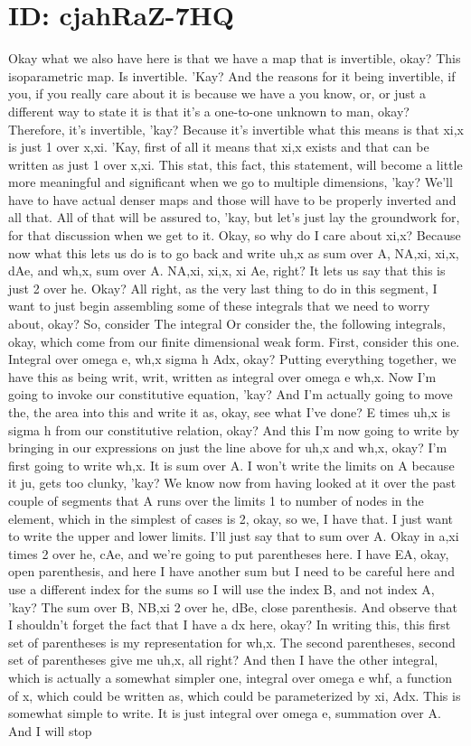 \documentclass[10pt]{article}
\begin{document}
\section*{ID: cjahRaZ-7HQ}
Okay what we also have here is that we have a map that is invertible, okay? This isoparametric map. Is invertible. 'Kay? And the reasons for it being invertible, if you, if you really care about it is because we have a you know, or, or just a different way to state it is that it's a one-to-one unknown to man, okay? Therefore, it's invertible, 'kay? Because it's invertible what this means is that xi,x is just 1 over x,xi. 'Kay, first of all it means that xi,x exists and that can be written as just 1 over x,xi. This stat, this fact, this statement, will become a little more meaningful and significant when we go to multiple dimensions, 'kay? We'll have to have actual denser maps and those will have to be properly inverted and all that. All of that will be assured to, 'kay, but let's just lay the groundwork for, for that discussion when we get to it. Okay, so why do I care about xi,x? Because now what this lets us do is to go back and write uh,x as sum over A, NA,xi, xi,x, dAe, and wh,x, sum over A. NA,xi, xi,x, xi Ae, right? It lets us say that this is just 2 over he. Okay? All right, as the very last thing to do in this segment, I want to just begin assembling some of these integrals that we need to worry about, okay? So, consider The integral Or consider the, the following integrals, okay, which come from our finite dimensional weak form. First, consider this one. Integral over omega e, wh,x sigma h Adx, okay? Putting everything together, we have this as being writ, writ, written as integral over omega e wh,x. Now I'm going to invoke our constitutive equation, 'kay? And I'm actually going to move the, the area into this and write it as, okay, see what I've done? E times uh,x is sigma h from our constitutive relation, okay? And this I'm now going to write by bringing in our expressions on just the line above for uh,x and wh,x, okay? I'm first going to write wh,x. It is sum over A. I won't write the limits on A because it ju, gets too clunky, 'kay? We know now from having looked at it over the past couple of segments that A runs over the limits 1 to number of nodes in the element, which in the simplest of cases is 2, okay, so we, I have that. I just want to write the upper and lower limits. I'll just say that to sum over A. Okay in a,xi times 2 over he, cAe, and we're going to put parentheses here. I have EA, okay, open parenthesis, and here I have another sum but I need to be careful here and use a different index for the sums so I will use the index B, and not index A, 'kay? The sum over B, NB,xi 2 over he, dBe, close parenthesis. And observe that I shouldn't forget the fact that I have a dx here, okay? In writing this, this first set of parentheses is my representation for wh,x. The second parentheses, second set of parentheses give me uh,x, all right? And then I have the other integral, which is actually a somewhat simpler one, integral over omega e whf, a function of x, which could be written as, which could be parameterized by xi, Adx. This is somewhat simple to write. It is just integral over omega e, summation over A. And I will stop 
\end{document}
